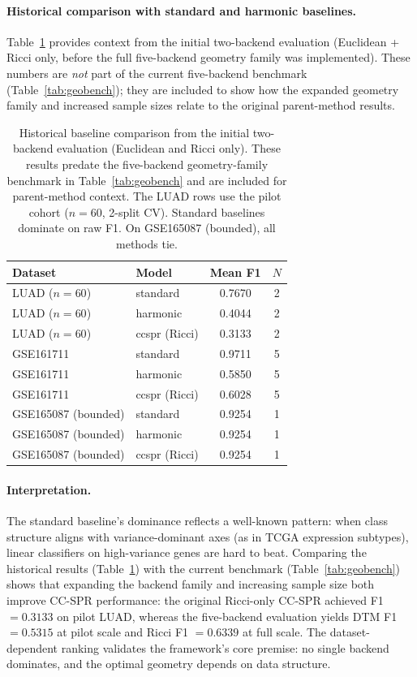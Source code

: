 \documentclass[11pt]{article}
\begin{document}
\paragraph{Historical comparison with standard and harmonic baselines.}
Table~\ref{tab:baselines} provides context from the initial two-backend evaluation (Euclidean + Ricci only, before the full five-backend geometry family was implemented).
These numbers are \emph{not} part of the current five-backend benchmark (Table~\ref{tab:geobench}); they are included to show how the expanded geometry family and increased sample sizes relate to the original parent-method results.

\begin{table}[h]
\centering
\small
\begin{tabular}{llcc}
\toprule
Dataset & Model & Mean F1 & $N$ \\
\midrule
LUAD ($n=60$) & standard & 0.7670 & 2 \\
LUAD ($n=60$) & harmonic & 0.4044 & 2 \\
LUAD ($n=60$) & ccspr (Ricci) & 0.3133 & 2 \\
\midrule
GSE161711 & standard & 0.9711 & 5 \\
GSE161711 & harmonic & 0.5850 & 5 \\
GSE161711 & ccspr (Ricci) & 0.6028 & 5 \\
\midrule
GSE165087 (bounded) & standard & 0.9254 & 1 \\
GSE165087 (bounded) & harmonic & 0.9254 & 1 \\
GSE165087 (bounded) & ccspr (Ricci) & 0.9254 & 1 \\
\bottomrule
\end{tabular}
\caption{Historical baseline comparison from the initial two-backend evaluation (Euclidean and Ricci only).
These results predate the five-backend geometry-family benchmark in Table~\ref{tab:geobench} and are included for parent-method context.
The LUAD rows use the pilot cohort ($n = 60$, 2-split CV).
Standard baselines dominate on raw F1.
On GSE165087 (bounded), all methods tie.}
\label{tab:baselines}
\end{table}

\paragraph{Interpretation.}
The standard baseline's dominance reflects a well-known pattern: when class structure aligns with variance-dominant axes (as in TCGA expression subtypes), linear classifiers on high-variance genes are hard to beat.
Comparing the historical results (Table~\ref{tab:baselines}) with the current benchmark (Table~\ref{tab:geobench}) shows that expanding the backend family and increasing sample size both improve CC-SPR performance: the original Ricci-only CC-SPR achieved F1 $= 0.3133$ on pilot LUAD, whereas the five-backend evaluation yields DTM F1 $= 0.5315$ at pilot scale and Ricci F1 $= 0.6339$ at full scale.
The dataset-dependent ranking validates the framework's core premise: no single backend dominates, and the optimal geometry depends on data structure.
\end{document}
